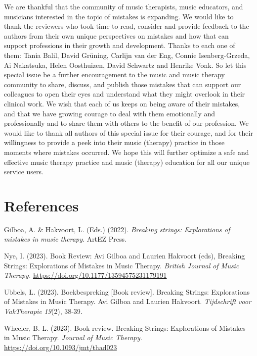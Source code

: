\documentclass[authordate, empirical, issue]{jote-new-article}
\begin{document}
We are thankful that the community of music therapists, music educators, and musicians interested in the topic of mistakes is expanding. We would like to thank the reviewers who took time to read, consider and provide feedback to the authors from their own unique perspectives on mistakes and how that can support professions in their growth and development. Thanks to each one of them: Tania Balil, David Grüning, Carlijn van der Eng, Connie Isenberg-Grzeda, Ai Nakatsuka, Helen Oosthuizen, David Schwartz and Henrike Vonk. So let this special issue be a further encouragement to the music and music therapy community to share, discuss, and publish those mistakes that can support our colleagues to open their eyes and understand what they might overlook in their clinical work. We wish that each of us keeps on being aware of their mistakes, and that we have growing courage to deal with them emotionally and professionally and to share them with others to the benefit of our profession. We would like to thank all authors of this special issue for their courage, and for their willingness to provide a peek into their music (therapy) practice in those moments where mistakes occurred. We hope this will further optimize a safe and effective music therapy practice and music (therapy) education for all our unique service users.
\newpage
\section{References}

Gilboa, A. \& Hakvoort, L. (Eds.) (2022). \emph{Breaking strings: Explorations of mistakes in music therapy}. ArtEZ Press.

\hspace*{\parindent}Nye, I. (2023). Book Review: Avi Gilboa and Laurien Hakvoort (eds), Breaking Strings: Explorations of Mistakes in Music Therapy. \emph{British Journal of Music Therapy. }\url{https://doi.org/10.1177/13594575231179191}



Ubbels, L. (2023). Boekbespreking [Book review]. Breaking Strings: Explorations of Mistakes in Music Therapy. Avi Gilboa and Laurien Hakvoort. \emph{Tijdschrift}\emph{ }\emph{voor}\emph{ }\emph{VakTherapie}\emph{ 19}(2), 38-39.



Wheeler, B. L. (2023). Book review. Breaking Strings: Explorations of Mistakes in Music Therapy. \emph{Journal of Music Therapy. }\url{https://doi.org/10.1093/jmt/thad023}
\end{document}

